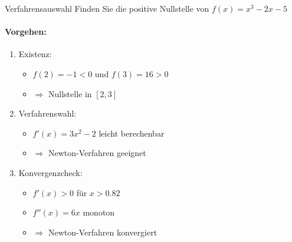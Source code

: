 \begin{example2}{Verfahrensauswahl}
Finden Sie die positive Nullstelle von $f(x) = x^3 - 2x - 5$

\paragraph{Vorgehen:}
\begin{enumerate}
    \item Existenz:
    \begin{itemize}
        \item $f(2) = -1 < 0$ und $f(3) = 16 > 0$
        \item $\Rightarrow$ Nullstelle in $[2,3]$
    \end{itemize}
    
    \item Verfahrenswahl:
    \begin{itemize}
        \item $f'(x) = 3x^2 - 2$ leicht berechenbar
        \item $\Rightarrow$ Newton-Verfahren geeignet
    \end{itemize}
    
    \item Konvergenzcheck:
    \begin{itemize}
        \item $f'(x) > 0$ für $x > 0.82$
        \item $f''(x) = 6x$ monoton
        \item $\Rightarrow$ Newton-Verfahren konvergiert
    \end{itemize}
\end{enumerate}
\end{example2}

